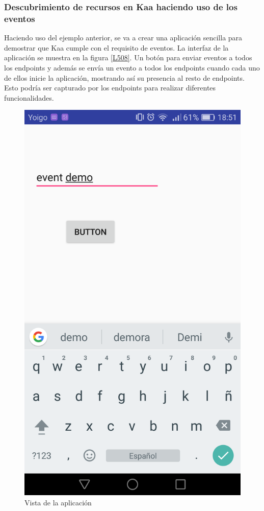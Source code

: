 \documentclass[12pt, twoside]{book}
\begin{document}
\subsubsection*{Descubrimiento de recursos en Kaa haciendo uso de los eventos}
Haciendo uso del ejemplo anterior, se va a crear una aplicación sencilla para demostrar que Kaa cumple con el requisito de eventos. La interfaz de la aplicación se muestra en la figura \ref{L508}. Un botón para enviar eventos a todos los endpoints y además se envía un evento a todos los endpoints cuando cada uno de ellos inicie la aplicación, mostrando así su presencia al resto de endpoints. Esto podría ser capturado por los endpoints para realizar diferentes funcionalidades.
\begin{figure}[H]
\centering
\includegraphics[scale=0.2]{images/screenshot.png}
\caption{Vista de la aplicación}\label{L509}
\end{figure}
\end{document}
